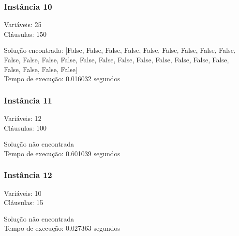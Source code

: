 \documentclass[12pt]{article}
\begin{document}
    \subsubsection{Instância 10}
        \begin{tcolorbox}[title=Entrada da instância 10, width=\linewidth, fontupper=\ttfamily,  halign=flush left]
            Variáveis: 25 \\
            Cláusulas: 150
        \end{tcolorbox}
        \begin{tcolorbox}[title=Saída da instância 10, width=\linewidth, fontupper=\ttfamily, halign=flush left]
            Solução encontrada: [False, False, False, False, False, False, False, False, False, False, False, False, False, False, False, False, False, False, False, False, False, False, False, False, False] \\
            Tempo de execução: 0.016032 segundos
        \end{tcolorbox}

    \subsubsection{Instância 11}
        \begin{tcolorbox}[title=Entrada da instância 11, width=\linewidth, fontupper=\ttfamily,  halign=flush left]
            Variáveis: 12 \\
            Cláusulas: 100
        \end{tcolorbox}
        \begin{tcolorbox}[title=Saída da instância 11, width=\linewidth, fontupper=\ttfamily, halign=flush left]
            Solução não encontrada \\
            Tempo de execução: 0.601039 segundos
        \end{tcolorbox}
    \subsubsection{Instância 12}
        \begin{tcolorbox}[title=Entrada da instância 12, width=\linewidth, fontupper=\ttfamily,  halign=flush left]
            Variáveis: 10 \\
            Cláusulas: 15
        \end{tcolorbox}
        \begin{tcolorbox}[title=Saída da instância 12, width=\linewidth, fontupper=\ttfamily, halign=flush left]
            Solução não encontrada \\
            Tempo de execução: 0.027363 segundos
        \end{tcolorbox}
\end{document}
